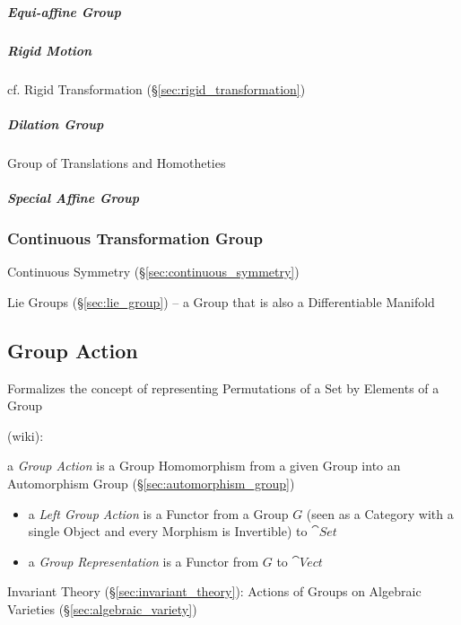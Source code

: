 \subparagraph{Equi-affine Group}\label{sec:equiaffine_group}\hfill

\subparagraph{Rigid Motion}\label{sec:rigid_motion}\hfill

cf. Rigid Transformation (\S\ref{sec:rigid_transformation})



\subparagraph{Dilation Group}\label{sec:dilation_group}\hfill

Group of Translations and Homotheties



\subparagraph{Special Affine Group}\label{sec:special_affine_group}\hfill



\subsubsection{Continuous Transformation Group}
\label{sec:continuous_transformation_group}

Continuous Symmetry (\S\ref{sec:continuous_symmetry})

Lie Groups (\S\ref{sec:lie_group}) -- a Group that is also a
Differentiable Manifold



\subsection{Group Action}\label{sec:group_action}

Formalizes the concept of representing Permutations of a Set by Elements of a
Group

(wiki):

a \emph{Group Action} is a Group Homomorphism from a given Group into an
Automorphism Group (\S\ref{sec:automorphism_group})

\begin{itemize}
  \item a \emph{Left Group Action} is a Functor from a Group $G$ (seen as a
    Category with a single Object and every Morphism is Invertible) to
    $\cat{Set}$
  \item a \emph{Group Representation} is a Functor from $G$ to $\cat{Vect}$
\end{itemize}

Invariant Theory (\S\ref{sec:invariant_theory}): Actions of Groups on
Algebraic Varieties (\S\ref{sec:algebraic_variety})

